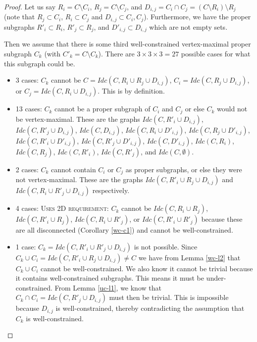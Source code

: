 \documentclass[11pt]{article}
\newcommand{\todo}[1]{\textsc{{\color{red}#1}}}
\begin{document}
\begin{proof}
Let us say $R_i=C\setminus C_i$, $R_j=C\setminus C_j$, and $D_{i,j}=C_i\cap C_j=(C\setminus R_i)\setminus R_j$ (note that $R_j\subset C_i$, $R_i\subset C_j$ and $D_{i,j}\subset C_i,C_j$). Furthermore, we have the proper subgraphs $R'_i\subset R_i$, $R'_j\subset R_j$, and $D'_{i,j}\subset D_{i,j}$ which are not empty sets.

Then we assume that there is some third well-constrained vertex-maximal proper subgraph $C_k$ (with $C'_k=C\setminus C_k$). There are $3\times 3\times 3 = 27$ possible cases for what this subgraph could be.

\begin{itemize}
    \item 3 cases: $C_k$ cannot be $C=Idc(C,R_i\cup R_j\cup D_{i,j})$, $C_i=Idc(C,R_j\cup D_{i,j})$, or $C_j=Idc(C,R_i\cup D_{i,j})$. This is by definition.

    \item 13 cases: $C_k$ cannot be a proper subgraph of $C_i$ and $C_j$ or else $C_k$ would not be vertex-maximal. These are the graphs $Idc(C,R'_i\cup D_{i,j})$, $Idc(C,R'_j\cup D_{i,j})$, $Idc(C, D_{i,j})$, $Idc(C,R_i\cup D'_{i,j})$, $Idc(C,R_j\cup D'_{i,j})$, $Idc(C,R'_i\cup D'_{i,j})$, $Idc(C,R'_j\cup D'_{i,j})$, $Idc(C, D'_{i,j})$, $Idc(C,R_i)$, $Idc(C,R_j)$, $Idc(C,R'_i)$, $Idc(C,R'_j)$, and $Idc(C,\emptyset)$.

    \item 2 cases: $C_k$ cannot contain $C_i$ or $C_j$ as proper subgraphs, or else they were not vertex-maximal. These are the graphs $Idc(C,R'_i\cup R_j\cup D_{i,j})$ and $Idc(C,R_i\cup R'_j\cup D_{i,j})$ respectively.

    \item 4 cases: \todo{Uses 2D requirement:} $C_k$ cannot be $Idc(C,R_i\cup R_j)$, $Idc(C,R'_i\cup R_j)$, $Idc(C,R_i\cup R'_j)$, or $Idc(C,R'_i\cup R'_j)$ because these are all disconnected (Corollary \ref{wc-c1}) and cannot be well-constrained.

    \item 1 case: $C_k=Idc(C,R'_i\cup R'_j\cup D_{i,j})$ is not possible. Since $C_k\cup C_i = Idc(C,R'_i\cup R_j\cup D_{i,j})\neq C$ we have from Lemma \ref{wc-l2} that $C_k\cup C_i$ cannot be well-constrained. We also know it cannot be trivial because it contains well-constrained subgraphs. This means it must be under-constrained. From Lemma \ref{uc-l1}, we know that $C_k\cap C_i=Idc(C,R'_j\cup D_{i,j})$ must then be trivial. This is impossible because $D_{i,j}$ is well-constrained, thereby contradicting the assumption that $C_k$ is well-constrained.


\end{itemize}
\end{proof}
\end{document}
